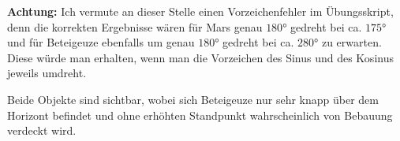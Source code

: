 \documentclass[a4paper,german,12pt,smallheadings]{scrartcl}
\begin{document}
\begin{enumerate}[a)]
    \textbf{Achtung:} Ich vermute an dieser Stelle einen Vorzeichenfehler im
    Übungsskript, denn die korrekten Ergebnisse wären für Mars genau
    $\ang{180}$ gedreht bei ca.  $\ang{175}$ und für Beteigeuze ebenfalls um
    genau $\ang{180}$ gedreht bei ca. $\ang{280}$ zu erwarten. Diese würde man
    erhalten, wenn man die Vorzeichen des Sinus und des Kosinus jeweils
    umdreht.

    Beide Objekte sind sichtbar, wobei sich Beteigeuze nur sehr knapp über dem
    Horizont befindet und ohne erhöhten Standpunkt wahrscheinlich von Bebauung
    verdeckt wird.
\end{enumerate}
\end{document}
